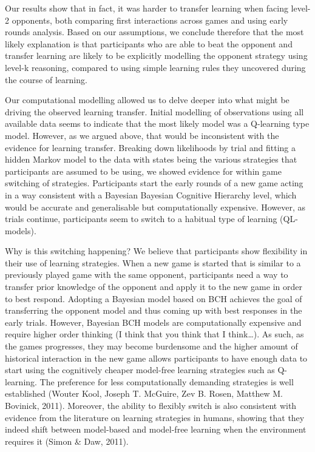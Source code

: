 \documentclass[man,floatsintext]{apa6}
\begin{document}
Our results show that in fact, it was harder to transfer learning when facing level-2 opponents, both comparing first interactions across games and using early rounds analysis. Based on our assumptions, we conclude therefore that the most likely explanation is that participants who are able to beat the opponent and transfer learning are likely to be explicitly modelling the opponent strategy using level-k reasoning, compared to using simple learning rules they uncovered during the course of learning.

Our computational modelling allowed us to delve deeper into what might be driving the observed learning transfer. Initial modelling of observations using all available data seems to indicate that the most likely model was a Q-learning type model. However, as we argued above, that would be inconsistent with the evidence for learning transfer. Breaking down likelihoods by trial and fitting a hidden Markov model to the data with states being the various strategies that participants are assumed to be using, we showed evidence for within game switching of strategies. Participants start the early rounds of a new game acting in a way consistent with a Bayesian Bayesian Cognitive Hierarchy level, which would be accurate and generalisable but computationally expensive. However, as trials continue, participants seem to switch to a habitual type of learning (QL-models).

Why is this switching happening? We believe that participants show flexibility in their use of learning strategies. When a new game is started that is similar to a previously played game with the same opponent, participants need a way to transfer prior knowledge of the opponent and apply it to the new game in order to best respond. Adopting a Bayesian model based on BCH achieves the goal of transferring the opponent model and thus coming up with best responses in the early trials. However, Bayesian BCH models are computationally expensive and require higher order thinking (I think that you think that I think\ldots{}). As such, as the games progresses, they may become burdensome and the higher amount of historical interaction in the new game allows participants to have enough data to start using the cognitively cheaper model-free learning strategies such as Q-learning. The preference for less computationally demanding strategies is well established (Wouter Kool, Joseph T. McGuire, Zev B. Rosen, Matthew M. Bovinick, 2011). Moreover, the ability to flexibly switch is also consistent with evidence from the literature on learning strategies in humans, showing that they indeed shift between model-based and model-free learning when the environment requires it (Simon \& Daw, 2011).
\end{document}
